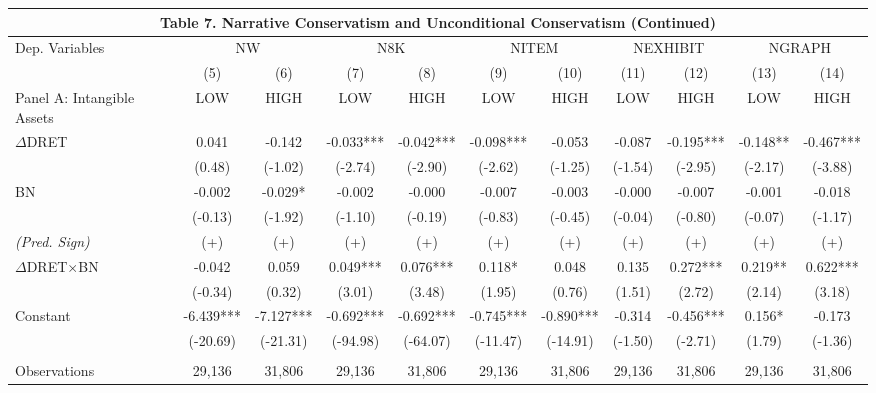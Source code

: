 \begin{table}
	\begin{center}
		\tabcolsep=0.11cm
		\begin{tabular}{lcccccccccc}
			\multicolumn{11}{c}{\textbf{Table 7. Narrative Conservatism and Unconditional Conservatism (Continued)}} \\
			\toprule
			\toprule
			Dep. Variables & \multicolumn{2}{c}{NW} & \multicolumn{2}{c}{N8K} & \multicolumn{2}{c}{NITEM} & \multicolumn{2}{c}{NEXHIBIT} & \multicolumn{2}{c}{NGRAPH} \\
			\cmidrule{2-11}
			& (5) & (6) & (7) & (8) & (9) & (10) & (11) & (12) & (13) & (14) \\
			\midrule
			Panel A: Intangible Assets & LOW & HIGH & LOW & HIGH & LOW & HIGH & LOW & HIGH & LOW & HIGH \\
			\midrule
			$\Delta$DRET & 0.041 & -0.142 & -0.033*** & -0.042*** & -0.098*** & -0.053 & -0.087 & -0.195*** & -0.148** & -0.467*** \\
			& (0.48) & (-1.02) & (-2.74) & (-2.90) & (-2.62) & (-1.25) & (-1.54) & (-2.95) & (-2.17) & (-3.88) \\
			BN & -0.002 & -0.029* & -0.002 & -0.000 & -0.007 & -0.003 & -0.000 & -0.007 & -0.001 & -0.018 \\
			& (-0.13) & (-1.92) & (-1.10) & (-0.19) & (-0.83) & (-0.45) & (-0.04) & (-0.80) & (-0.07) & (-1.17) \\
			\rowcolor[rgb]{ .906,  .902,  .902} \textit{(Pred. Sign)} & (+) & (+) & (+) & (+) & (+) & (+) & (+) & (+) & (+) & (+) \\
			\rowcolor[rgb]{ .906,  .902,  .902} $\Delta$DRET$\times$BN & -0.042 & 0.059 & 0.049*** & 0.076*** & 0.118* & 0.048 & 0.135 & 0.272*** & 0.219** & 0.622*** \\
			\rowcolor[rgb]{ .906,  .902,  .902} & (-0.34) & (0.32) & (3.01) & (3.48) & (1.95) & (0.76) & (1.51) & (2.72) & (2.14) & (3.18) \\
			Constant & -6.439*** & -7.127*** & -0.692*** & -0.692*** & -0.745*** & -0.890*** & -0.314 & -0.456*** & 0.156* & -0.173 \\
			& (-20.69) & (-21.31) & (-94.98) & (-64.07) & (-11.47) & (-14.91) & (-1.50) & (-2.71) & (1.79) & (-1.36) \\
			&   &   &   &   &   &   &   &   &   &  \\
			Observations & 29,136 & 31,806 & 29,136 & 31,806 & 29,136 & 31,806 & 29,136 & 31,806 & 29,136 & 31,806 \\

\end{tabular}
\end{center}
\end{table}
